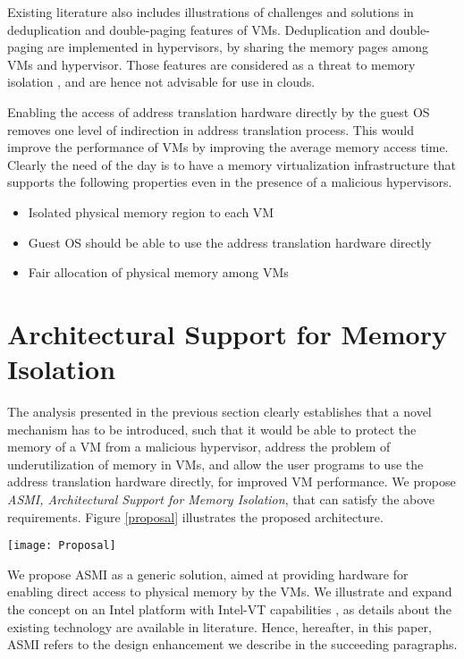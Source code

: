 \documentclass[a4paper,10pt,twocolumn]{article}
\begin{document}
  Existing literature also includes illustrations of challenges and solutions in deduplication \cite{chiang2013introspection} \cite{chen2014cmd} and double-paging \cite{arya2014tesseract} features of VMs. Deduplication and double-paging are implemented in hypervisors, by sharing the memory pages among VMs and hypervisor. Those features are considered as a threat to memory isolation \cite{jithin2014virtual}, and are hence not advisable for use in clouds.

  Enabling the access of address translation hardware directly by the guest OS removes one level of indirection in address translation process. This would improve the performance of VMs by improving the average memory access time. Clearly the need of the day is to have a memory virtualization infrastructure that supports the following properties even in the presence of a malicious hypervisors.
  \begin{itemize}
   \item Isolated physical memory region to each VM
   \item Guest OS should be able to use the address translation hardware directly
   \item Fair allocation of physical memory among VMs
  \end{itemize}

  \section{Architectural Support for Memory Isolation} \label{solution}

   The analysis presented in the previous section clearly establishes that a novel mechanism has to be introduced, such that it would be able to protect the memory of a VM from a malicious hypervisor,  address the problem of underutilization of memory in VMs,  and allow the user programs to use the address translation hardware directly, for improved VM performance.   We propose  \textit{ASMI, Architectural Support for Memory Isolation},  that can satisfy the above requirements. Figure \ref{proposal} illustrates the proposed architecture.

  \begin{figure*}[ht!]
  \centering
  \texttt{[image: Proposal]}
  \caption{ASMI: Architectural Support for Memory Isolation}
  \label{proposal}
  \end{figure*}

   We propose ASMI as a generic solution, aimed at providing hardware for enabling direct access to physical memory by the VMs. We illustrate and expand the concept on an Intel platform with Intel-VT capabilities \cite{vt-directed-io-spec}, as details about the existing technology are available in literature.  Hence, hereafter, in this paper,  ASMI refers to the design enhancement we describe in the succeeding paragraphs.
   
\end{document}
